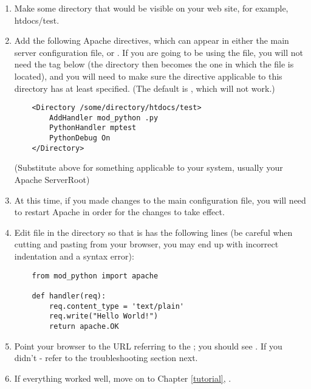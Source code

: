 \begin{enumerate}

\item
  Make some directory that would be visible on your web site, for
  example, htdocs/test.

\item
  Add the following Apache directives, which can appear in either the
  main server configuration file, or .  If you are
  going to be using the  file, you will not need the
   tag below (the directory then becomes the one in
  which the  file is located), and you will need to
  make sure the  directive applicable to this
  directory has at least  specified. (The default is
  , which will not work.)  

  \begin{verbatim}
    <Directory /some/directory/htdocs/test> 
        AddHandler mod_python .py
        PythonHandler mptest 
        PythonDebug On 
    </Directory>
  \end{verbatim}

  (Substitute  above for something applicable to
  your system, usually your Apache ServerRoot)

\item
  At this time, if you made changes to the main configuration file, you
  will need to restart Apache in order for the changes to take effect.

\item
  Edit  file in the  directory so
  that is has the following lines (be careful when cutting and pasting
  from your browser, you may end up with incorrect indentation and a
  syntax error):

  \begin{verbatim}
    from mod_python import apache

    def handler(req):
        req.content_type = 'text/plain'
        req.write("Hello World!")
        return apache.OK 
  \end{verbatim}

\item
  Point your browser to the URL referring to the ;
  you should see . If you didn't - refer to the
  troubleshooting section next.

\item
  If everything worked well, move on to Chapter \ref{tutorial}, 
  . 

\end{enumerate}

